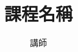\documentclass[12pt]{article}
\title{課程名稱}
\author{講師}
\begin{document}
\maketitle
\newpage

\tableofcontents
\pagebreak


\end{document}
